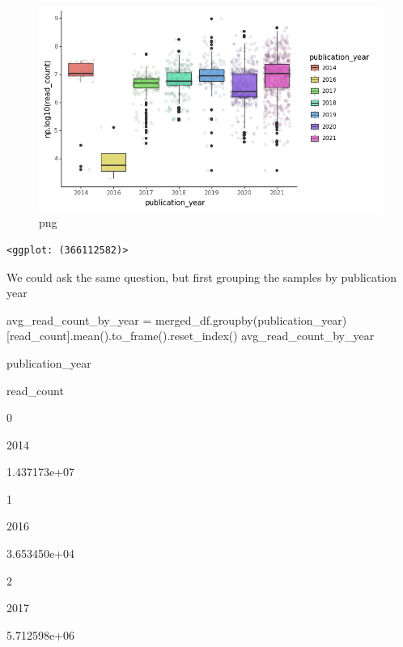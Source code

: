 \documentclass[
  letterpaper,
]{book}
\newenvironment{Shaded}{}{}
\newcommand{\NormalTok}[1]{\textcolor[rgb]{0.14,0.16,0.18}{#1}}
\newcommand{\OperatorTok}[1]{\textcolor[rgb]{0.14,0.16,0.18}{#1}}
\newcommand{\StringTok}[1]{\textcolor[rgb]{0.01,0.18,0.38}{#1}}
\begin{document}
\begin{figure}

{\centering \includegraphics{assets/images/chapters/introduction-to-python/tutorial_114_0.png}

}

\caption{png}

\end{figure}

\begin{verbatim}
<ggplot: (366112582)>
\end{verbatim}

We could ask the same question, but first grouping the samples by
publication year

\begin{Shaded}
\begin{Highlighting}[]
\NormalTok{avg\_read\_count\_by\_year }\OperatorTok{=}\NormalTok{ merged\_df.groupby(}\StringTok{\textquotesingle{}publication\_year\textquotesingle{}}\NormalTok{)[}\StringTok{\textquotesingle{}read\_count\textquotesingle{}}\NormalTok{].mean().to\_frame().reset\_index()}
\NormalTok{avg\_read\_count\_by\_year}
\end{Highlighting}
\end{Shaded}

publication\_year

read\_count

0

2014

1.437173e+07

1

2016

3.653450e+04

2

2017

5.712598e+06
\end{document}
